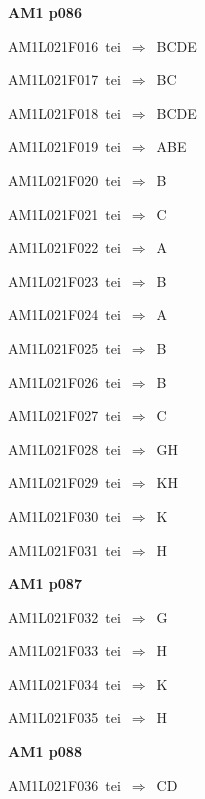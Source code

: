 \par\vfill\eject
{\bf\hfill AM1 p086\hfill\hbox{}}\par\bigskip
{\sixrm AM1L021F016\ {\sixit tei}\ }$\Rightarrow$\ BCDE\par\smallskip
{\sixrm AM1L021F017\ {\sixit tei}\ }$\Rightarrow$\ BC\par\smallskip
{\sixrm AM1L021F018\ {\sixit tei}\ }$\Rightarrow$\ BCDE\par\smallskip
{\sixrm AM1L021F019\ {\sixit tei}\ }$\Rightarrow$\ ABE\par\smallskip
{\sixrm AM1L021F020\ {\sixit tei}\ }$\Rightarrow$\ B\par\smallskip
{\sixrm AM1L021F021\ {\sixit tei}\ }$\Rightarrow$\ C\par\smallskip
{\sixrm AM1L021F022\ {\sixit tei}\ }$\Rightarrow$\ A\par\smallskip
{\sixrm AM1L021F023\ {\sixit tei}\ }$\Rightarrow$\ B\par\smallskip
{\sixrm AM1L021F024\ {\sixit tei}\ }$\Rightarrow$\ A\par\smallskip
{\sixrm AM1L021F025\ {\sixit tei}\ }$\Rightarrow$\ B\par\smallskip
{\sixrm AM1L021F026\ {\sixit tei}\ }$\Rightarrow$\ B\par\smallskip
{\sixrm AM1L021F027\ {\sixit tei}\ }$\Rightarrow$\ C\par\smallskip
{\sixrm AM1L021F028\ {\sixit tei}\ }$\Rightarrow$\ GH\par\smallskip
{\sixrm AM1L021F029\ {\sixit tei}\ }$\Rightarrow$\ KH\par\smallskip
{\sixrm AM1L021F030\ {\sixit tei}\ }$\Rightarrow$\ K\par\smallskip
{\sixrm AM1L021F031\ {\sixit tei}\ }$\Rightarrow$\ H\par\smallskip

\par\vfill\eject
{\bf\hfill AM1 p087\hfill\hbox{}}\par\bigskip
{\sixrm AM1L021F032\ {\sixit tei}\ }$\Rightarrow$\ G\par\smallskip
{\sixrm AM1L021F033\ {\sixit tei}\ }$\Rightarrow$\ H\par\smallskip
{\sixrm AM1L021F034\ {\sixit tei}\ }$\Rightarrow$\ K\par\smallskip
{\sixrm AM1L021F035\ {\sixit tei}\ }$\Rightarrow$\ H\par\smallskip

\par\vfill\eject
{\bf\hfill AM1 p088\hfill\hbox{}}\par\bigskip
{\sixrm AM1L021F036\ {\sixit tei}\ }$\Rightarrow$\ CD\par\smallskip

